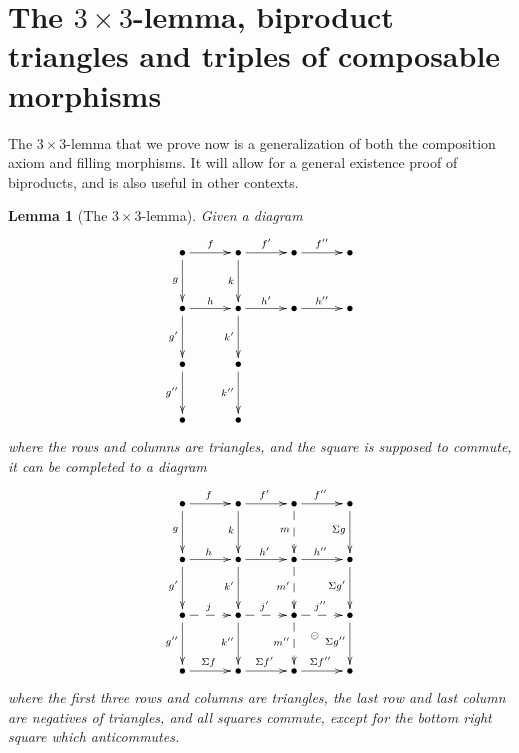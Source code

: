 \documentclass{amsproc}
\newtheorem{lem}[prop]{Lemma}
\theoremstyle{definition}
\begin{document}
\section{The $3\!\!\times\!\!3$-lemma, biproduct triangles and triples of composable morphisms}

The $3\!\!\times\!\!3$-lemma that we prove now is a generalization of both the composition axiom and filling morphisms. It will allow for a general existence proof of biproducts, and is also useful in other contexts.

\begin{lem}[The $3\!\!\times\!\!3$-lemma]
\label{3x3lemma}
Given a diagram
\begin{displaymath}
\xymatrix@!@+5pt{{\bullet}\ar[r]^f\ar[d]_g & {\bullet}\ar[r]^{f'}\ar[d]_k & {\bullet}\ar[r]^{f''} & {\bullet}\\
{\bullet}\ar[r]^h\ar[d]_{g'} & {\bullet}\ar[r]^{h'}\ar[d]_{k'} & {\bullet}\ar[r]^{h''} & {\bullet}\\
{\bullet}\ar[d]_{g''} & {\bullet}\ar[d]_{k''} & &\\
{\bullet} & {\bullet} & &}
\end{displaymath}
where the rows and columns are triangles, and the square is supposed to commute, it can be completed to a diagram
\begin{displaymath}
\xymatrix@!@+5pt{{\bullet}\ar[r]^(.47)f\ar[d]_(.47)g & {\bullet}\ar[r]^(.47){f'}\ar[d]_(.47)k & {\bullet}\ar[r]^(.47){f''}\ar@{-->}[d]_(.47)m & {\bullet}\ar[d]_(.47){\Sigma g}\\
{\bullet}\ar[r]^(.47)h\ar[d]_(.47){g'} & {\bullet}\ar[r]^(.47){h'}\ar[d]_(.47){k'} & {\bullet}\ar[r]^(.47){h''}\ar@{-->}[d]_(.47){m'} & {\bullet}\ar[d]_(.47){\Sigma g'}\\
{\bullet}\ar@{-->}[r]^(.47)j\ar[d]_(.47){g''} & {\bullet}\ar@{-->}[r]^(.47){j'}\ar[d]_(.47){k''} & {\bullet}\ar@{-->}[r]^(.47){j''}\ar@{-->}[d]_(.47){m''}\ar@{}[rd]|(.37)\circleddash & {\bullet}\ar[d]_(.47){\Sigma g''}\\
{\bullet}\ar[r]^(.47){\Sigma f} & {\bullet}\ar[r]^(.47){\Sigma f'} & {\bullet}\ar[r]^(.47){\Sigma f''} & {\bullet}}
\end{displaymath}
where the first three rows and columns are triangles, the last row and last column are negatives of triangles, and all squares commute, except for the bottom right square which anticommutes.
\end{lem}
\end{document}

